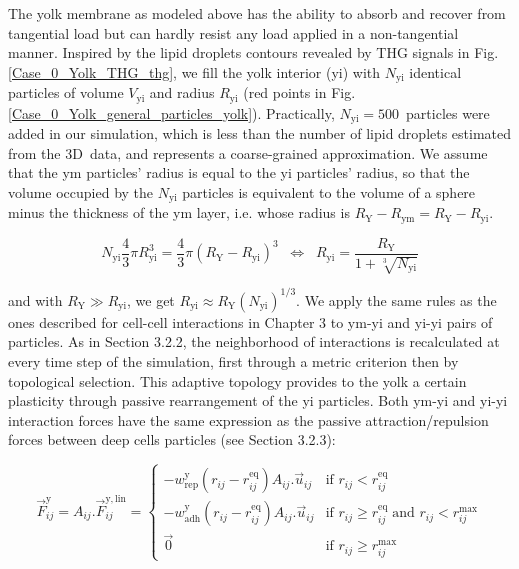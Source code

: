 The yolk membrane as modeled above has the ability to absorb and recover from tangential load but can hardly resist any load applied in a non-tangential manner. Inspired by the lipid droplets contours revealed by THG signals in Fig. \ref{Case_0_Yolk_THG_thg}, we fill the yolk interior (yi) with $N_{\mathrm{yi}}$ identical particles of volume $V_{\mathrm{yi}}$ and radius $R_{\mathrm{yi}}$ (red points in Fig. \ref{Case_0_Yolk_general_particles_yolk}). Practically, $N_{\mathrm{yi}} = 500$ particles were added in our simulation, which is less than the number of lipid droplets estimated from the 3D data, and represents a coarse-grained approximation. We assume that the ym particles' radius is equal to the yi particles' radius, so that the volume occupied by the $N_{\mathrm{yi}}$ particles is equivalent to the volume of a sphere minus the thickness of the ym layer, i.e. whose radius is $R_{\mathrm{Y}} - R_{\mathrm{ym}} = R_{\mathrm{Y}} - R_{\mathrm{yi}}$.

$$ N_{\mathrm{yi}} \frac{4}{3} \pi R_{\mathrm{yi}}^3 = \frac{4}{3} \pi (R_{\mathrm{Y}} - R_{\mathrm{yi}})^3 \;\;\Leftrightarrow\;\; R_{\mathrm{yi}} = \frac{R_{\mathrm{Y}}}{1 + \sqrt[3]{N_{\mathrm{yi}}}}$$

and with $R_{\mathrm{Y}} \gg R_{\mathrm{yi}}$, we get $R_{\mathrm{yi}} \approx R_{\mathrm{Y}} (N_{\mathrm{yi}})^{1/3}$. We apply the same rules as the ones described for cell-cell interactions in Chapter 3 to ym-yi and yi-yi pairs of particles. As in Section 3.2.2, the neighborhood of interactions is recalculated at every time step of the simulation, first through a metric criterion then by topological selection. This adaptive topology provides to the yolk a certain plasticity through passive rearrangement of the yi particles. Both ym-yi and yi-yi interaction forces have the same expression as the passive attraction/repulsion forces between deep cells particles (see Section 3.2.3):

$$\vec{F}^{\mathrm{y}}_{ij} = A_{ij}.\vec{F}^{\mathrm{y},\mathrm{lin}}_{ij} =  \begin{cases}  - w^{\mathrm{y}}_{\mathrm{rep}}(r_{ij}-r^{\mathrm{eq}}_{ij}) A_{ij}.\vec{u}_{ij} & \text{if }r_{ij} \lt r^{\mathrm{eq}}_{ij} \\  - w^{\mathrm{y}}_{\mathrm{adh}}(r_{ij}-r^{\mathrm{eq}}_{ij}) A_{ij}.\vec{u}_{ij} & \text{if }r_{ij} \geq r^{\mathrm{eq}}_{ij} \;\text{and }r_{ij} \lt r^{\mathrm{max}}_{ij} \\  \vec{0} & \text{if }r_{ij} \geq r^{\mathrm{max}}_{ij}  \end{cases}$$

